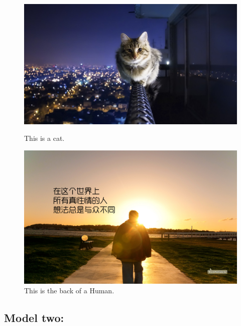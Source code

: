 \documentclass[a4paper,11pt]{article}
\begin{document}
\begin{figure}[!h]
  \centering %
  \begin{minipage}[t]{.49\linewidth}
  \includegraphics[width=1\textwidth]{./Pic/cat.JPG}
  \caption{This is a cat.}
  \end{minipage}
  \begin{minipage}[t]{.49\linewidth}
  \includegraphics[width=1\textwidth]{./Pic/human.jpg}
  \caption{This is the back of a Human.}
  \end{minipage}
\end{figure}

\subsection{Model two:}
\end{document}
